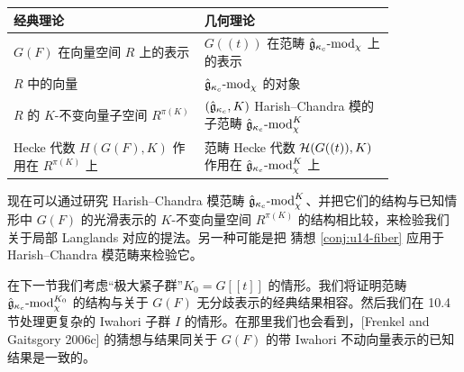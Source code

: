 \begin{center}
\begin{tabular}{p{0.42\linewidth}p{0.42\linewidth}}
\toprule
经典理论 & 几何理论 \\
\midrule
$G(F)$ 在向量空间 $R$ 上的表示 & $G((t))$ 在范畴 $\hat{\mathfrak{g}}_{\kappa_c}\text{-}\mathrm{mod}_\chi$ 上的表示 \\
$R$ 中的向量 & $\hat{\mathfrak{g}}_{\kappa_c}\text{-}\mathrm{mod}_\chi$ 的对象 \\
$R$ 的 $K$-不变向量子空间 $R^{\pi(K)}$ & $(\hat{\mathfrak{g}}_{\kappa_c},K)$ Harish--Chandra 模的子范畴 $\hat{\mathfrak{g}}_{\kappa_c}\text{-}\mathrm{mod}_\chi^K$ \\
Hecke 代数 $H(G(F),K)$ 作用在 $R^{\pi(K)}$ 上 & 范畴 Hecke 代数 $\mathcal{H}(G((t)),K)$ 作用在 $\hat{\mathfrak{g}}_{\kappa_c}\text{-}\mathrm{mod}_\chi^K$ 上 \\
\bottomrule
\end{tabular}
\end{center}

现在可以通过研究 Harish--Chandra 模范畴 $\hat{\mathfrak{g}}_{\kappa_c}\text{-}\mathrm{mod}_\chi^K$、并把它们的结构与已知情形中 $G(F)$ 的光滑表示的 $K$-不变向量空间 $R^{\pi(K)}$ 的结构相比较，来检验我们关于局部 Langlands 对应的提法。另一种可能是把 猜想 \ref{conj:u14-fiber} 应用于 Harish--Chandra 模范畴来检验它。

在下一节我们考虑“极大紧子群”$K_0=G[[t]]$ 的情形。我们将证明范畴 $\hat{\mathfrak{g}}_{\kappa_c}\text{-}\mathrm{mod}_\chi^{K_0}$ 的结构与关于 $G(F)$ 无分歧表示的经典结果相容。然后我们在 10.4 节处理更复杂的 Iwahori 子群 $I$ 的情形。在那里我们也会看到，[Frenkel and Gaitsgory 2006c] 的猜想与结果同关于 $G(F)$ 的带 Iwahori 不动向量表示的已知结果是一致的。
